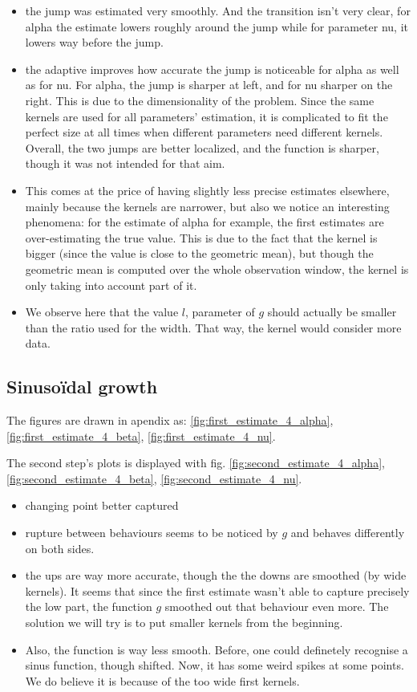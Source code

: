 \documentclass[11pt]{book}
\begin{document}
\begin{itemize}
\item the jump was estimated very smoothly. And the transition isn't very clear, for alpha the estimate lowers roughly around the jump while for parameter nu, it lowers way before the jump.
\item the adaptive improves how accurate the jump is noticeable for alpha as well as for nu. For alpha, the jump is sharper at left, and for nu sharper on the right. This is due to the dimensionality of the problem. Since the same kernels are used for all parameters' estimation, it is complicated to fit the perfect size at all times when different parameters need different kernels. Overall, the two jumps are better localized, and the function is sharper, though it was not intended for that aim. 
\item This comes at the price of having slightly less precise estimates elsewhere, mainly because the kernels are narrower, but also we notice an interesting phenomena: for the estimate of alpha for example, the first estimates are over-estimating the true value. This is due to the fact that the kernel is bigger (since the value is close to the geometric mean), but though the geometric mean is computed over the whole observation window, the kernel is only taking into account part of it. 
\item We observe here that the value $l$, parameter of $g$ should actually be smaller than the ratio used for the width. That way, the kernel would consider more data.
\end{itemize}

\subsection{Sinusoïdal growth}
The figures are drawn in apendix as: \ref{fig:first_estimate_4_alpha}, \ref{fig:first_estimate_4_beta}, \ref{fig:first_estimate_4_nu}.

The second step's plots is displayed with fig. \ref{fig:second_estimate_4_alpha}, \ref{fig:second_estimate_4_beta}, \ref{fig:second_estimate_4_nu}.

\begin{itemize}
\item changing point better captured
\item rupture between behaviours seems to be noticed by $g$ and behaves differently on both sides.
\item the ups are way more accurate, though the the downs are smoothed (by wide kernels). It seems that since the first estimate wasn't able to capture precisely the low part, the function $g$ smoothed out that behaviour even more. The solution we will try is to put smaller kernels from the beginning.
\item Also, the function is way less smooth. Before, one could definetely recognise a sinus function, though shifted. Now, it has some weird spikes at some points. We do believe it is because of the too wide first kernels.
\end{itemize}
\end{document}
